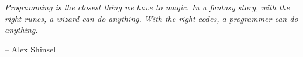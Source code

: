 \documentclass[\main/thesis.tex]{subfiles}
\begin{document}
\begin{quotepage}
 \vspace*{1in}
 \begin{center}
	\emph{Programming is the closest thing we have to magic. In a fantasy story, with the right runes, a wizard can do anything. With the right codes, a programmer can do anything.}
	\begin{flushright}
		-- Alex Shinsel
	\end{flushright}
 \end{center}
\end{quotepage}
\end{document}

